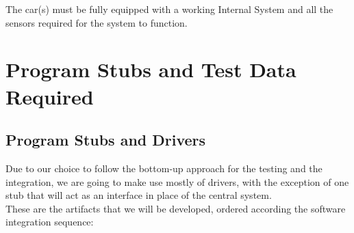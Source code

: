 \documentclass[english]{article}
\begin{document}
The car(s) must be fully equipped with a working Internal System and all the sensors required for the system to function.


\newpage
\section{Program Stubs and Test Data Required}

\subsection{Program Stubs and Drivers}

Due to our choice to follow the bottom-up approach for the testing and the integration, we are going to make use mostly of drivers, with the exception of one stub that will act as an interface in place of the central system.\\
These are the artifacts that we will be developed, ordered according the software integration sequence:
\end{document}
